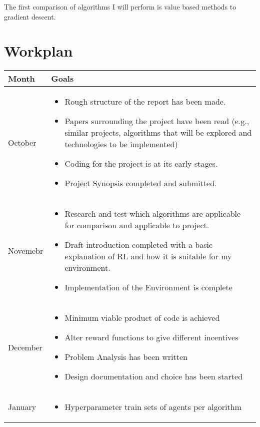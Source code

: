 \documentclass{surrey_disso_style}
\begin{document}
The first comparison of algorithms I will perform is value based methods to gradient descent.

\section{Workplan}

\renewcommand{\arraystretch}{1.5}
\setlength{\tabcolsep}{8pt}

\begin{center}
\begin{tabular}{|p{1.6cm}|p{13cm}|}
   \hline
   \textbf{Month} & \textbf{Goals}\\
   \hline
   October & \begin{itemize}
      \item Rough structure of the report has been made. 
      \item Papers surrounding the project have been read (e.g., similar projects, algorithms that will be explored and technologies to be implemented)
      \item Coding for the project is at its early stages.
      \item Project Synopsis completed and submitted.
   \end{itemize} \\
   \hline
   Novemebr & 
      \begin{itemize}
      \item Research and test which algorithms are applicable for comparison and applicable to project.
      \item Draft introduction completed with a basic explanation of RL and how it is suitable for my environment.
      \item Implementation of the Environment is complete
      \end{itemize}\\
   \hline
   December & \begin{itemize}
      \item Minimum viable product of code is achieved
      \item Alter reward functions to give different incentives
      \item Problem Analysis has been written
      \item Design documentation and choice has been started
   \end{itemize}\\
   \hline
   January & \begin{itemize}
      \item Hyperparameter train sets of agents per algorithm

\end{itemize}
\end{tabular}
\end{center}
\end{document}

